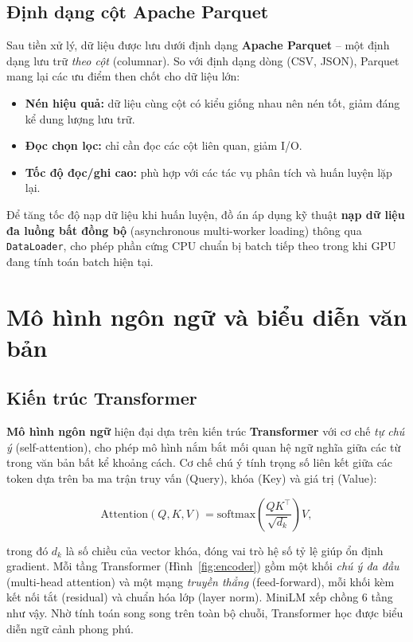 \subsection{Định dạng cột Apache Parquet}

Sau tiền xử lý, dữ liệu được lưu dưới định dạng \textbf{Apache Parquet} -- một định
dạng lưu trữ \textit{theo cột} (columnar). So với định dạng dòng (CSV, JSON),
Parquet mang lại các ưu điểm then chốt cho dữ liệu lớn:

\begin{itemize}[leftmargin=2em, itemsep=2pt]
    \item \textbf{Nén hiệu quả:} dữ liệu cùng cột có kiểu giống nhau nên nén tốt,
    giảm đáng kể dung lượng lưu trữ.
    \item \textbf{Đọc chọn lọc:} chỉ cần đọc các cột liên quan, giảm I/O.
    \item \textbf{Tốc độ đọc/ghi cao:} phù hợp với các tác vụ phân tích và huấn
    luyện lặp lại.
\end{itemize}

Để tăng tốc độ nạp dữ liệu khi huấn luyện, đồ án áp dụng kỹ thuật \textbf{nạp dữ
liệu đa luồng bất đồng bộ} (asynchronous multi-worker loading) thông qua
\texttt{DataLoader}, cho phép phần cứng CPU chuẩn bị batch tiếp theo trong khi GPU
đang tính toán batch hiện tại.

\section{Mô hình ngôn ngữ và biểu diễn văn bản}

\subsection{Kiến trúc Transformer}

\textbf{Mô hình ngôn ngữ} hiện đại dựa trên kiến trúc \textbf{Transformer} với cơ
chế \textit{tự chú ý} (self-attention), cho phép mô hình nắm bắt mối quan hệ ngữ
nghĩa giữa các từ trong văn bản bất kể khoảng cách. Cơ chế chú ý tính trọng số liên
kết giữa các token dựa trên ba ma trận truy vấn (Query), khóa (Key) và giá trị
(Value):

\begin{equation}
    \text{Attention}(Q, K, V) = \text{softmax}\!\left(\frac{Q K^\top}{\sqrt{d_k}}\right) V,
\end{equation}

trong đó $d_k$ là số chiều của vector khóa, đóng vai trò hệ số tỷ lệ giúp ổn định
gradient. Mỗi tầng Transformer (Hình~\ref{fig:encoder}) gồm một khối \textit{chú ý
đa đầu} (multi-head attention) và một mạng \textit{truyền thẳng} (feed-forward),
mỗi khối kèm kết nối tắt (residual) và chuẩn hóa lớp (layer norm). MiniLM xếp chồng
$6$ tầng như vậy. Nhờ tính toán song song trên toàn bộ chuỗi, Transformer học được
biểu diễn ngữ cảnh phong phú.

